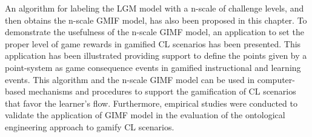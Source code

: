 An algorithm for labeling the LGM model with a n-scale of challenge levels, and then obtains the n-scale GMIF model, has also been proposed in this chapter. To demonstrate the usefulness of the n-scale GIMF model, an application to set the proper level of game rewards in gamified CL scenarios has been presented. This application has been illustrated providing support to define the points given by a point-system as game consequence events in gamified instructional and learning events. This algorithm and the n-scale GIMF model can be used in computer-based mechanisms and procedures to support the gamification of CL scenarios that favor the learner's flow. Furthermore, empirical studies were conducted to validate the application of GIMF model in the evaluation of the ontological engineering approach to gamify CL scenarios.
